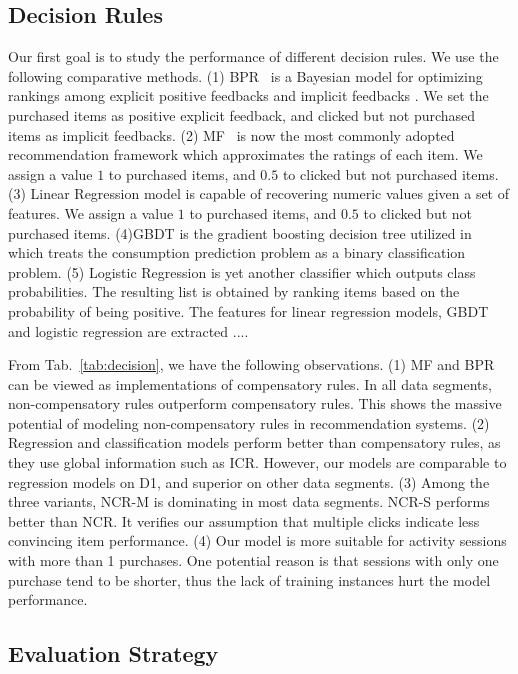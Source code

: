 \documentclass[sigconf]{acmart}
\begin{document}
\subsection{Decision Rules}

Our first goal is to study the performance of different decision rules. We use the following comparative methods. (1) BPR~\cite{Rendle2009} is a Bayesian model for optimizing rankings among explicit positive feedbacks and implicit feedbacks . We set the purchased items as positive explicit feedback, and clicked but not purchased items as implicit feedbacks. (2) MF~\cite{Koren2009Matrix} is now the most commonly adopted recommendation framework which approximates the ratings of each item. We assign a value $1$ to purchased items, and $0.5$ to clicked but not purchased items. (3) Linear Regression model is capable of recovering numeric values given a set of features. We assign a value $1$ to purchased items, and $0.5$ to clicked but not purchased items. (4)GBDT is the  gradient boosting decision tree utilized in~\cite{Yan2015E} which treats the consumption prediction problem as a binary classification problem. (5) Logistic Regression is yet another classifier which outputs class probabilities. The resulting list is obtained by ranking items based on the probability of being positive. The features for linear regression models, GBDT and logistic regression are extracted ....

From Tab.~\ref{tab:decision}, we have the following observations. (1) MF and BPR can be viewed as implementations of compensatory rules. In all data segments, non-compensatory rules outperform compensatory rules. This shows the massive potential of modeling non-compensatory rules in recommendation systems. (2) Regression and classification models perform better than compensatory rules, as they use global information such as ICR. However, our models are comparable to regression models on D1, and superior on other data segments. (3) Among the three variants, NCR-M is dominating in most data segments. NCR-S performs better than NCR. It verifies our assumption that multiple clicks indicate less convincing item performance. (4) Our model is more suitable for activity sessions with more than 1 purchases. One potential reason is that sessions with only one purchase tend to be shorter, thus the lack of training instances hurt the model performance.  


\subsection{Evaluation Strategy}
\end{document}
